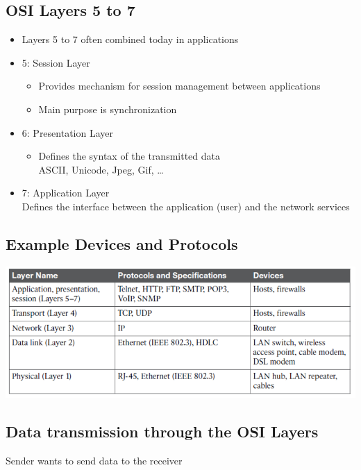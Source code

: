 \documentclass[11pt]{article}
\begin{document}
\subsection{OSI Layers 5 to 7}
\begin{itemize}
    \item Layers 5 to 7 often combined today in applications
    \item 5: Session Layer
    \begin{itemize}
        \item Provides mechanism for session management between applications
        \item Main purpose is synchronization
    \end{itemize}
    \item 6: Presentation Layer
    \begin{itemize}
        \item Defines the syntax of the transmitted data \\
        ASCII, Unicode, Jpeg, Gif, …
    \end{itemize}
    \item 7: Application Layer \\
    Defines the interface between the application (user) and the network services
\end{itemize}
\subsection{Example Devices and Protocols}
\includegraphics[width=\textwidth]{example-devices-and-protocols}
\subsection{Data transmission through the OSI Layers}
Sender wants to send data to the receiver
\end{document}
